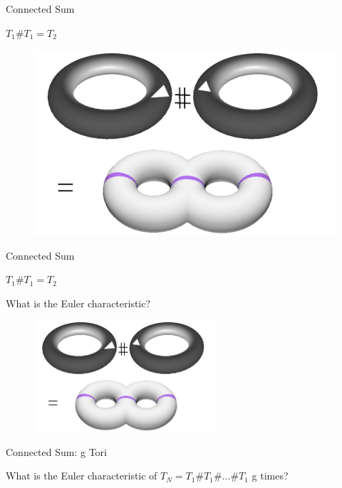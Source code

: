 \documentclass{beamer}
\begin{document}
\begin{frame}{Connected Sum}

$T_1 \# T_1 = T_2$

\begin{figure}[t]
    \includegraphics[width=\textwidth]{ConnectedSum.png}
\end{figure}

\end{frame}


\begin{frame}{Connected Sum}

$T_1 \# T_1 = T_2$

What is the Euler characteristic?

\begin{figure}[t]
    \includegraphics[width=0.6\textwidth]{ConnectedSum.png}
\end{figure}

\end{frame}


\begin{frame}{Connected Sum: g Tori}

What is the Euler characteristic of $T_N = T_1 \# T_1 \# \hdots \# T_1$ g times?



\end{frame}
\end{document}
